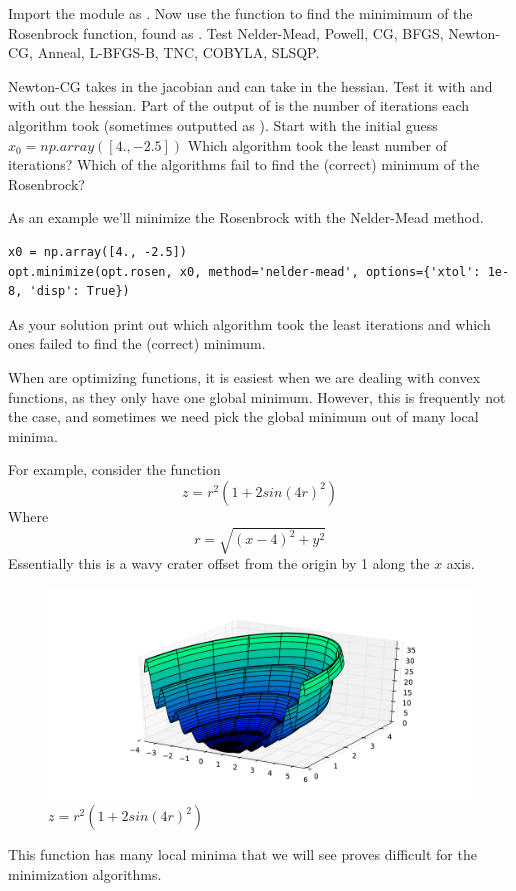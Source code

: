 \begin{problem}

Import the  module as . Now use the  function to find the minimimum of the Rosenbrock function, found as . Test Nelder-Mead, Powell, CG, BFGS, Newton-CG, Anneal, L-BFGS-B, TNC, COBYLA, SLSQP. 

Newton-CG takes in the jacobian and can take in the hessian. Test it with and with out the hessian. Part of the output of  is the number of iterations each algorithm took (sometimes outputted as ). Start with the initial guess $x_0=np.array([4., -2.5])$  Which algorithm took the least number of iterations?  Which of the algorithms fail to find the (correct) minimum of the Rosenbrock?

As an example we'll minimize the Rosenbrock with the Nelder-Mead method.

\begin{lstlisting}
x0 = np.array([4., -2.5])
opt.minimize(opt.rosen, x0, method='nelder-mead', options={'xtol': 1e-8, 'disp': True})
\end{lstlisting}

As your solution print out which algorithm took the least iterations and which ones failed to find the (correct) minimum.

\end{problem}

When are optimizing functions, it is easiest when we are dealing with convex functions, as they only have one global minimum. However, this is frequently not the case, and sometimes we need pick the global minimum out of many local minima.

For example, consider the function
\[
z = r^2 (1+ 2sin(4r)^2)
\]
Where
\[
r = \sqrt{(x-4)^2 + y^2}
\]
Essentially this is a wavy crater offset from the origin by 1 along the $x$ axis.
\begin{figure}
\includegraphics[width=\textwidth]{ManyMinima.pdf}
\caption{$z = r^2 (1+ 2sin(4r)^2)$}
\label{opt:muiltmin}
\end{figure}
This function has many local minima that we will see proves difficult for the minimization algorithms.

